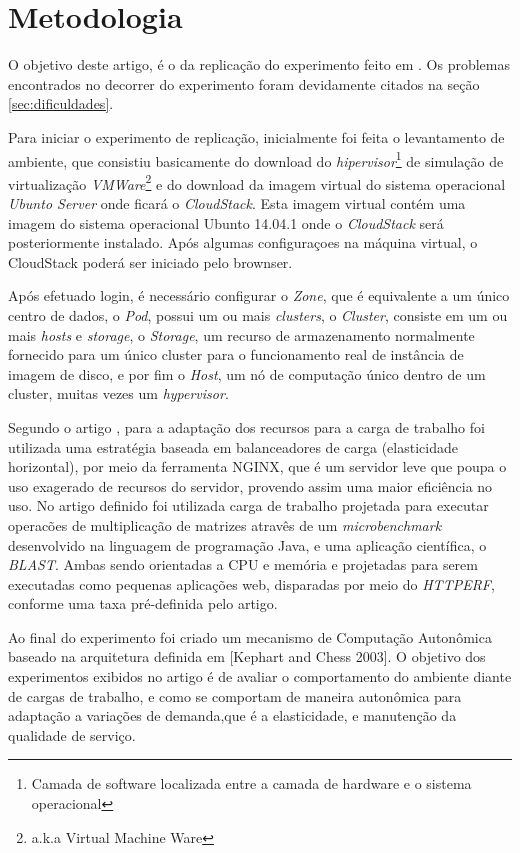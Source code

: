\section{Metodologia}

O objetivo deste artigo, é o da replicação do experimento feito em \cite{coutinho_et_al:14}. Os problemas encontrados no decorrer do experimento foram devidamente citados na seção \ref{sec:dificuldades}.

Para iniciar o experimento de replicação, inicialmente foi feita o levantamento de ambiente, que consistiu basicamente do download do \textit{hipervisor}\footnote{Camada de software localizada entre a camada de hardware e o sistema operacional\cite{dev_midia}} de simulação de virtualização \textit{VMWare}\footnote{a.k.a Virtual Machine Ware} e do download da imagem virtual do sistema operacional \textit{Ubunto Server} onde ficará o \textit{CloudStack}. Esta imagem virtual contém uma imagem do sistema operacional Ubunto 14.04.1 onde o \textit{CloudStack} será posteriormente instalado. Após algumas configuraçoes na máquina virtual, o CloudStack poderá ser iniciado pelo brownser.

Após efetuado login, é necessário configurar o \textit{Zone}, que é equivalente a um único centro de dados, o \textit{Pod}, possui um ou mais \textit{clusters}, o \textit{Cluster}, consiste em um ou mais \textit{hosts} e \textit{storage}, o \textit{Storage}, um recurso de armazenamento normalmente fornecido para um único cluster para o funcionamento real de instância de imagem de disco, e por fim o \textit{Host}, um nó de computação único dentro de um cluster, muitas vezes um \textit{hypervisor}.

Segundo o artigo \cite{coutinho_et_al:14}, para a adaptação dos recursos para a carga de trabalho foi utilizada uma estratégia baseada em balanceadores de carga (elasticidade horizontal), por meio da ferramenta NGINX, que é um servidor leve que poupa o uso exagerado de recursos do servidor, provendo assim uma maior eficiência no uso. No artigo definido foi utilizada carga de trabalho projetada para executar operacões de multiplicação de matrizes atravês de um \textit{microbenchmark} desenvolvido na linguagem de programação Java, e uma aplicação científica, o \textit{BLAST}. Ambas sendo orientadas a CPU e memória e projetadas para serem executadas como pequenas aplicações web, disparadas por meio do \textit{HTTPERF}, conforme uma taxa pré-definida pelo artigo.

Ao final do experimento foi criado um mecanismo de Computação Autonômica baseado na arquitetura definida em [Kephart and Chess 2003]. O objetivo dos experimentos exibidos no artigo é de avaliar o comportamento do ambiente diante de cargas de trabalho, e como se comportam de maneira autonômica para adaptação a variações de demanda,que é a elasticidade, e manutenção da qualidade de serviço.
